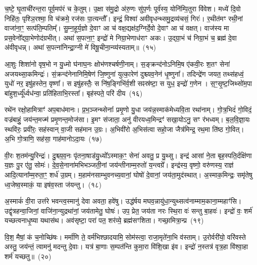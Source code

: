 च॒ष्टे॒ घृ॒ताची॑रन्त॒रा पूर्व॒मप॑रं च के॒तुम्। उ॒क्षा स॑मु॒द्रो अ॑रु॒णः सु॑प॒र्णः पूर्व॑स्य॒ योनि॑म्पि॒तुरा वि॑वेश। मध्ये॑ दि॒वो निहि॑तः॒ पृश्ञि॒रश्मा॒ वि च॑क्रमे॒ रज॑सः पा॒त्यन्तौ᳚। इन्द्रं॒ विश्वा॑ अवीवृधन्थ्समु॒द्रव्य॑चसं॒ गिरः॑। र॒थीत॑मꣳ रथी॒नां वाजा॑ना॒ꣳ॒ सत्प॑ति॒म्पतिम्᳚। सु॒म्न॒हूर्य॒ज्ञो दे॒वाꣳ आ च॑ वक्ष॒द्यक्ष॑द॒ग्निर्दे॒वो दे॒वाꣳ आ च॑ वक्षत्। वाज॑स्य मा प्रस॒वेनो᳚द्ग्रा॒भेणोद॑ग्रभीत्। अथा॑ स॒पत्ना॒ꣳ॒ इन्द्रो॑ मे निग्रा॒भेणाध॑राꣳ अकः। उ॒द्ग्रा॒भं च॑ निग्रा॒भं च॒ ब्रह्म॑ दे॒वा अ॑वीवृधन्न्। अथा॑ स॒पत्ना॑निन्द्रा॒ग्नी मे॑ विषू॒चीना॒न्व्य॑स्यताम्॥~(१५)

{\anuvakamend[{दे॒वाः श॒तप॑या अ॒भि वाज॑स्य॒ षड्विꣳ॑शतिश्च}]}%

आ॒शुः शिशा॑नो वृष॒भो न यु॒ध्मो घ॑नाघ॒नः क्षोभ॑णश्चर्\mbox{}षणी॒नाम्। स॒ङ्क्रन्द॑नो\-ऽनिमि॒ष ए॑कवी॒रः श॒तꣳ सेना॑ अजयथ्सा॒कमिन्द्रः॑। सं॒क्रन्द॑नेनानिमि॒षेण॑ जि॒ष्णुना॑ युत्का॒रेण॑ दुश्च्यव॒नेन॑ धृ॒ष्णुना᳚। तदिन्द्रे॑ण जयत॒ तथ्स॑हध्वं॒ युधो॑ नर॒ इषु॑हस्तेन॒ वृष्णा᳚। स इषु॑हस्तैः॒ स नि॑ष॒ङ्गिभि॑र्व॒शी सꣴस्र॑ष्टा॒ स युध॒ इन्द्रो॑ ग॒णेन। स॒ꣳ॒सृ॒ष्ट॒जिथ्सो॑म॒पा बा॑हुश॒र्ध्यू᳚र्ध्वध॑न्वा॒ प्रति॑हिताभि॒रस्ता᳚। बृह॑स्पते॒ परि॑ दीय~(१६)

रथे॑न रक्षो॒हामित्राꣳ॑ अप॒बाध॑मानः। प्र॒भ॒ञ्जन्थ्सेनाः᳚ प्रमृ॒णो यु॒धा जय॑न्न॒स्माक॑मेध्यवि॒ता रथा॑नाम्। गो॒त्र॒भिदं॑ गो॒विदं॒ वज्र॑बाहुं॒ जय॑न्त॒मज्म॑ प्रमृ॒णन्त॒मोज॑सा। इ॒मꣳ स॑जाता॒ अनु॑ वीरयध्व॒मिन्द्रꣳ॑ सखा॒यो\-ऽनु॒ सꣳ र॑भध्वम्। ब॒ल॒वि॒ज्ञा॒यः स्थवि॑रः॒ प्रवी॑रः॒ सह॑स्वान् वा॒जी सह॑मान उ॒ग्रः। अ॒भिवी॑रो अ॒भिस॑त्वा सहो॒जा जैत्र॑मिन्द्र॒ रथ॒मा ति॑ष्ठ गो॒वित्। अ॒भि गो॒त्राणि॒ सह॑सा॒ गाह॑मानो\-ऽदा॒यः~(१७)

वी॒रः श॒तम॑न्यु॒रिन्द्रः॑। दु॒श्च्य॒व॒नः पृ॑तना॒षाड॑यु॒ध्यो᳚\-ऽस्माक॒ꣳ॒ सेना॑ अवतु॒ प्र यु॒थ्सु। इन्द्र॑ आसां ने॒ता बृह॒स्पति॒र्दक्षि॑णा य॒ज्ञः पु॒र ए॑तु॒ सोमः॑। दे॒व॒से॒नाना॑मभिभञ्जती॒नां जय॑न्तीनाम्म॒रुतो॑ य॒न्त्वग्रे᳚। इन्द्र॑स्य॒ वृष्णो॒ वरु॑णस्य॒ राज्ञ॑ आदि॒त्याना᳚म्म॒रुता॒ꣳ॒ शर्ध॑ उ॒ग्रम्। म॒हाम॑नसाम्भुवनच्य॒वानां॒ घोषो॑ दे॒वानां॒ जय॑ता॒मुद॑स्थात्। अ॒स्माक॒मिन्द्रः॒ समृ॑तेषु ध्व॒जेष्व॒स्माकं॒ या इष॑व॒स्ता ज॑यन्तु।~(१८)

अ॒स्माकं॑ वी॒रा उत्त॑रे भवन्त्व॒स्मानु॑ देवा अवता॒ हवे॑षु। उद्ध॑र्\mbox{}षय मघव॒न्नायु॑धा॒न्युथ्सत्व॑नाम्माम॒काना॒म्महाꣳ॑सि। उद्वृ॑त्रहन्वा॒जिनां॒ वाजि॑ना॒न्युद्रथा॑नां॒ जय॑तामेतु॒ घोषः॑। उप॒ प्रेत॒ जय॑ता नरः स्थि॒रा वः॑ सन्तु बा॒हवः॑। इन्द्रो॑ वः॒ शर्म॑ यच्छत्वनाधृ॒ष्या यथास॑थ। अव॑सृष्टा॒ परा॑ पत॒ शर॑व्ये॒ ब्रह्म॑सꣳशिता। गच्छा॒मित्रा॒न्प्र~(१९)

वि॒श॒ मैषां॒ कं च॒नोच्छि॑षः। मर्मा॑णि ते॒ वर्म॑भिश्छादयामि॒ सोम॑स्त्वा॒ राजा॒मृते॑ना॒भि व॑स्ताम्। उ॒रोर्वरी॑यो॒ वरि॑वस्ते अस्तु॒ जय॑न्तं॒ त्वामनु॑ मदन्तु दे॒वाः। यत्र॑ बा॒णाः स॒म्पत॑न्ति कुमा॒रा वि॑शि॒खा इ॑व। इन्द्रो॑ न॒स्तत्र॑ वृत्र॒हा वि॑श्वा॒हा शर्म॑ यच्छतु॥~(२०)

